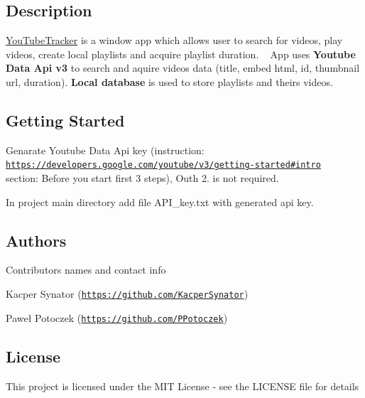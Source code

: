  \subsection*{Description}

\mbox{\hyperlink{namespace_you_tube_tracker}{You\+Tube\+Tracker}} is a window app which allows user to search for videos, play videos, create local playlists and acquire playlist duration. ~\newline
App uses {\bfseries Youtube Data Api v3} to search and aquire videos data (title, embed html, id, thumbnail url, duration). {\bfseries Local database} is used to store playlists and theirs videos.

\subsection*{Getting Started}


\begin{DoxyItemize}
\item Genarate Youtube Data Api key (instruction\+: \href{https://developers.google.com/youtube/v3/getting-started#intro}{\tt https\+://developers.\+google.\+com/youtube/v3/getting-\/started\#intro} ~\newline
section\+: Before you start first 3 steps), Outh 2. is not required.
\item In project main directory add file A\+P\+I\+\_\+key.\+txt with generated api key.
\end{DoxyItemize}

\subsection*{Authors}

Contributors names and contact info
\begin{DoxyItemize}
\item Kacper Synator (\href{https://github.com/KacperSynator}{\tt https\+://github.\+com/\+Kacper\+Synator})
\item Paweł Potoczek (\href{https://github.com/PPotoczek}{\tt https\+://github.\+com/\+P\+Potoczek})
\end{DoxyItemize}

\subsection*{License}

This project is licensed under the M\+IT License -\/ see the L\+I\+C\+E\+N\+SE file for details 